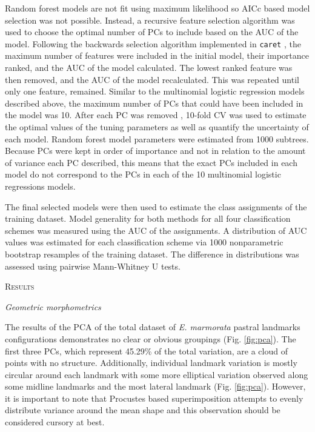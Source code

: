 \documentclass[12pt,letterpaper]{article}\usepackage{graphicx, color}
\renewcommand{\section}[1]{%
\bigskip
\begin{center}
\begin{Large}
\normalfont\scshape #1
\medskip
\end{Large}
\end{center}}
\renewcommand{\subsection}[1]{%
\bigskip
\begin{center}
\begin{large}
\normalfont\itshape #1
\end{large}
\end{center}}
\begin{document}
Random forest models are not fit using maximum likelihood so AICc based model selection was not possible. Instead, a recursive feature selection algorithm was used to choose the optimal number of PCs to include based on the AUC of the model. Following the backwards selection algorithm implemented in \texttt{caret} \citep{Kuhn2013}, the maximum number of features were included in the initial model, their importance ranked, and the AUC of the model calculated. The lowest ranked feature was then removed, and the AUC of the model recalculated. This was repeated until only one feature, remained. Similar to the multinomial logistic regression models described above, the maximum number of PCs that could have been included in the model was 10. After each PC was removed , 10-fold CV was used to estimate the optimal values of the tuning parameters as well as quantify the uncertainty of each model. Random forest model parameters were estimated from 1000 subtrees. Because PCs were kept in order of importance and not in relation to the amount of variance each PC described, this means that the exact PCs included in each model do not correspond to the PCs in each of the 10 multinomial logistic regressions models.

The final selected models were then used to estimate the class assignments of the training dataset. Model generality for both methods for all four classification schemes was measured using the AUC of the assignments. A distribution of AUC values was estimated for each classification scheme via 1000 nonparametric bootstrap resamples of the training dataset. The difference in distributions was assessed using pairwise Mann-Whitney U tests.

\section{Results}
\subsection{Geometric morphometrics}
The results of the PCA of the total dataset of \textit{E. marmorata} pastral landmarks configurations demonstrates no clear or obvious groupings (Fig. \ref{fig:pca}). The first three PCs, which represent 45.29\% of the total variation, are a cloud of points with no structure. Additionally, individual landmark variation is mostly circular around each landmark with some more elliptical variation observed along some midline landmarks and the most lateral landmark (Fig. \ref{fig:pca}). However, it is important to note that Procustes based superimposition attempts to evenly distribute variance around the mean shape \citep{Zelditch2004} and this observation should be considered cursory at best.
\end{document}
